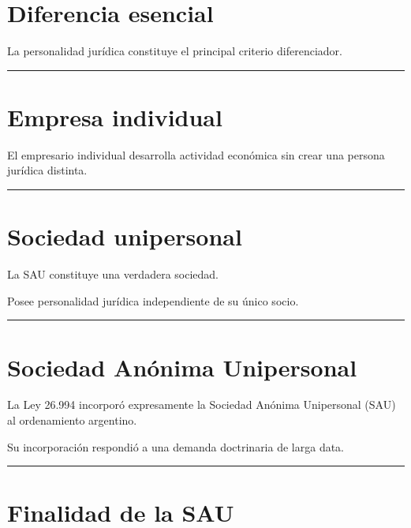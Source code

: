 \documentclass[
  spanish,
  letterpaper,
  DIV=11,
  numbers=noendperiod]{scrartcl}
\begin{document}
\section{Diferencia esencial}\label{diferencia-esencial}

La personalidad jurídica constituye el principal criterio diferenciador.

\begin{center}\rule{0.5\linewidth}{0.5pt}\end{center}

\section{Empresa individual}\label{empresa-individual}

El empresario individual desarrolla actividad económica sin crear una
persona jurídica distinta.

\begin{center}\rule{0.5\linewidth}{0.5pt}\end{center}

\section{Sociedad unipersonal}\label{sociedad-unipersonal}

La SAU constituye una verdadera sociedad.

Posee personalidad jurídica independiente de su único socio.

\begin{center}\rule{0.5\linewidth}{0.5pt}\end{center}

\section{Sociedad Anónima
Unipersonal}\label{sociedad-anuxf3nima-unipersonal}

La Ley 26.994 incorporó expresamente la Sociedad Anónima Unipersonal
(SAU) al ordenamiento argentino.

Su incorporación respondió a una demanda doctrinaria de larga data.

\begin{center}\rule{0.5\linewidth}{0.5pt}\end{center}

\section{Finalidad de la SAU}\label{finalidad-de-la-sau}
\end{document}
